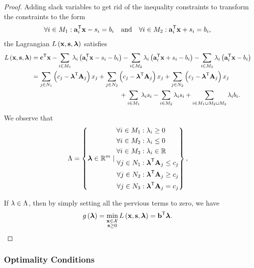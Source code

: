 \documentclass[11pt]{article}
\theoremstyle{definition}
\theoremstyle{remark}
\newcommand{\pqty}[1]{\left(#1\right)}
\newcommand{\set}[2]{\left\{#1\mid #2\right\}}
\newcommand{\RR}{\mathbb{R}}
\newcommand{\transpose}{^{\mathsf{T}}}
\newcommand{\qand}{\quad\text{and}\quad}
\begin{document}
\begin{proof}
    Adding slack variables to get rid of the inequality constraints to transform the constraints to the form
    \[
        \forall i \in M_1: \vb{a}_i\transpose \vb{x} - s_i = b_i \qand \forall i \in M_2: \vb{a}_i\transpose \vb{x} + s_i = b_i,
    \]
    the Lagrangian \(L\pqty{\vb{x}, \vb{s}, \vb*{\lambda}}\) satisfies
    \begin{align*}
        L\pqty{\vb{x}, \vb{s}, \vb*{\lambda}} &= \vb{c}\transpose \vb{x} - \sum_{i \in M_1} \lambda_i \pqty{\vb{a}_i\transpose \vb{x} - s_i - b_i} - \sum_{i \in M_2} \lambda_i \pqty{\vb{a}_i\transpose \vb{x} + s_i - b_i} - \sum_{i \in M_3} \lambda_i \pqty{\vb{a}_i\transpose \vb{x} - b_i} \\
        &= \sum_{j \in N_1} \pqty{c_j - \vb*{\lambda}\transpose \vb{A}_j} x_j + \sum_{j \in N_2} \pqty{c_j - \vb*{\lambda}\transpose \vb{A}_j} x_j + \sum_{j \in N_3} \pqty{c_j - \vb*{\lambda}\transpose \vb{A}_j} x_j \\
        &\phantom{=} \hspace{13em} + \sum_{i \in M_1} \lambda_i s_i - \sum_{i \in M_2} \lambda_i s_i + \sum_{i \in M_1 \cup M_2 \cup M_3} \lambda_i b_i.
    \end{align*}

    We observe that
    \[
        \Lambda = \set{\vb*{\lambda} \in \RR^m}{\begin{aligned}
            \forall i \in M_1 & : \lambda_i \geq 0 \\
            \forall i \in M_2 & : \lambda_i \leq 0 \\
            \forall i \in M_3 & : \lambda_i \in \RR \\
            \forall j \in N_1 & : \vb*{\lambda}\transpose \vb{A}_j \leq c_j \\
            \forall j \in N_2 & : \vb*{\lambda}\transpose \vb{A}_j \geq c_j \\
            \forall j \in N_3 & : \vb*{\lambda}\transpose \vb{A}_j = c_j
        \end{aligned}},
    \]

    If \(\vb{\lambda} \in \Lambda\), then by simply setting all the pervious terms to zero, we have
    \[
        g\pqty{\vb*{\lambda}} = \min_{\substack{\vb{x} \in \mathcal{X} \\ \vb{s} \geq 0}} L\pqty{\vb{x}, \vb{s}, \vb*{\lambda}} = \vb{b}\transpose \vb*{\lambda}.
    \]
\end{proof}

\subsubsection{Optimality Conditions}
\end{document}
